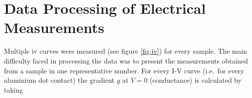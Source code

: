 \section{Data Processing of Electrical Measurements}
\label{sec:eval}
Multiple \gls{iv} curves were measured (see figure \ref{fig:iv}) for every sample.
The main difficulty faced in processing the data was to present the measurements obtained 
from a sample in one representative number. 
%
%
For every I-V curve (i.e.\ for every aluminium dot contact) the gradient $g$ at $V=0$ (conductance) is calculated by taking 
